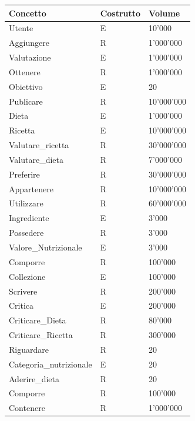 ﻿\documentclass[a4paper,12pt]{report}
\begin{document}
\begin{table}[H]
\center
    \begin{tabular}{ |p{1.7in}|p{0.8in}|p{1.4in}| }
        \hline
        Concetto  & Costrutto  & Volume \\
        \hline
        Utente   & E  & 10'000  \\
        Aggiungere   & R  & 1'000'000   \\
        Valutazione   & E   & 1'000'000    \\
        Ottenere & R&  1'000'000 \\
        Obiettivo & E& 20\\
        Publicare & R& 10'000'000\\
        Dieta & E& 1'000'000\\
        Ricetta & E& 10'000'000 \\
        Valutare\_ricetta & R& 30'000'000\\
        Valutare\_dieta &R & 7'000'000\\
        Preferire & R& 30'000'000\\
        Appartenere & R& 10'000'000\\
        Utilizzare & R& 60'000'000\\
        Ingrediente & E& 3'000\\
        Possedere & R& 3'000\\
        Valore\_Nutrizionale & E& 3'000\\
        Comporre & R& 100'000\\
        Collezione & E& 100'000\\
        Scrivere & R& 200'000 \\
        Critica & E& 200'000\\
        Criticare\_Dieta & R& 80'000 \\
        Criticare\_Ricetta & R& 300'000\\
        Riguardare & R& 20\\
        Categoria\_nutrizionale & E&20 \\
        Aderire\_dieta & R& 20\\
        Comporre & R& 100'000\\
        Contenere & R& 1'000'000\\
        \hline
    \end{tabular}  
\end{table}
\end{document}
